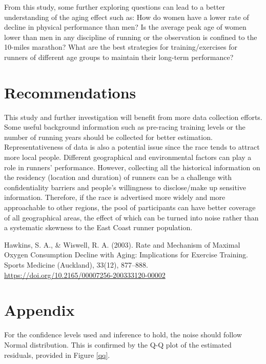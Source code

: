 \documentclass[12pt]{article}
\begin{document}
From this study, some further exploring questions can lead to a better understanding of the aging effect such as: How do women have a lower rate of decline in physical performance than men? Is the average peak age of women lower than men in any discipline of running or the observation is confined to the 10-miles marathon? What are the best strategies for training/exercises for runners of different age groups to maintain their long-term performance?

\section*{Recommendations}

This study and further investigation will benefit from more data collection efforts. Some useful background information such as pre-racing training levels or the number of running years should be collected for better estimation. Representativeness of data is also a potential issue since the race tends to attract more local people. Different geographical and environmental factors can play a role in runners’ performance. However, collecting all the historical information on the residency (location and duration) of runners can be a challenge with confidentiality barriers and people’s willingness to disclose/make up sensitive information. Therefore, if the race is advertised more widely and more approachable to other regions, the pool of participants can have better coverage of all geographical areas, the effect of which can be turned into noise rather than a systematic skewness to the East Coast runner population.

\begin{thebibliography}{9}

	Hawkins, S. A., \& Wiswell, R. A. (2003).
	Rate and Mechanism of Maximal Oxygen Consumption Decline with Aging:
	Implications for Exercise Training. Sports Medicine (Auckland), 33(12),
	877--888.
	\\
	\url{https://doi.org/10.2165/00007256-200333120-00002}


\end{thebibliography}


\appendix

\section{Appendix}

For the confidence levels used and inference to hold,
the noise should follow Normal distribution.
This is confirmed by the Q-Q plot of the estimated residuals,
provided in Figure \ref{qq}.
\end{document}
